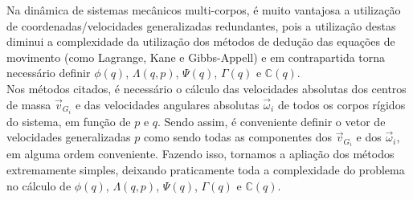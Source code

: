 \documentclass[12pt,a4paper]{article}
\begin{document}
Na dinâmica de sistemas mecânicos multi-corpos, é muito vantajosa a utilização de coordenadas/velocidades generalizadas redundantes, pois a utilização destas diminui a complexidade da utilização dos métodos de dedução das equações de movimento (como Lagrange, Kane e Gibbs-Appell) e em contrapartida torna necessário definir $\phi(q)$, $\Lambda(q,p)$, $\Psi(q)$, $\Gamma(q)$ e  $\mathbb{C}(q)$. \\

Nos métodos citados, é necessário o cálculo das velocidades absolutas dos centros de massa $\vec{v}_{G_i}$ e das velocidades angulares absolutas $\vec{\omega}_i$ de todos os corpos rígidos do sistema, em função de $p$ e $q$. Sendo assim, é conveniente definir o vetor de velocidades generalizadas $p$ como sendo todas as componentes dos $\vec{v}_{G_i}$ e dos $\vec{\omega}_i$, em alguma ordem conveniente. Fazendo isso, tornamos a apliação dos métodos extremamente simples, deixando praticamente toda a complexidade do problema no cálculo de $\phi(q)$, $\Lambda(q,p)$, $\Psi(q)$, $\Gamma(q)$ e  $\mathbb{C}(q)$. \\
\end{document}
